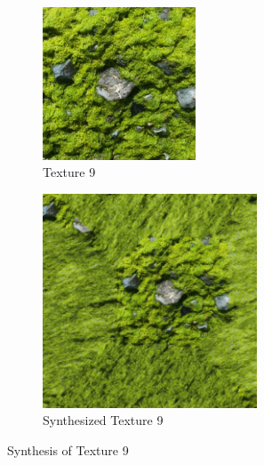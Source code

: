 \documentclass{article}
\begin{document}
\begin{figure}[H]
    \centering
    \begin{subfigure}[b]{0.49\textwidth}
        \centering
        \includegraphics[width=0.5\textwidth]{../Code/Textures/9.png}
        \caption{Texture 9}
        \label{fig:original-9}
    \end{subfigure}
    \hfill %
    \begin{subfigure}[b]{0.49\textwidth}
        \centering
        \includegraphics[width=0.7\textwidth]{../Result/9.png}
        \caption{Synthesized Texture 9}
        \label{fig:synthesized-9}
    \end{subfigure}
    \caption{Synthesis of Texture 9}
    \label{fig:synthesis-9}
\end{figure}
\end{document}
